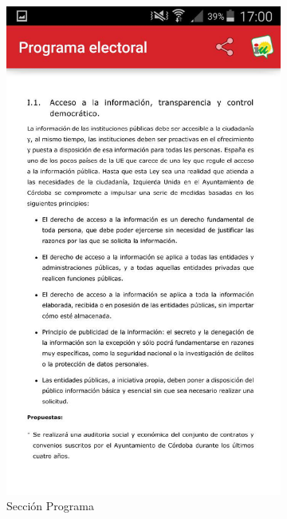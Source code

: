 \begin{figure}[H]
\begin{subfigure}[b]{0.3\textwidth}
                \includegraphics[width=\textwidth]{Media/Captures/IURecuperaCordobaSection.jpg}
                \caption{Sección Programa}
                \label{fig:iuSection}
        \end{subfigure}
        ~
        \begin{subfigure}[b]{0.3\textwidth}

\end{subfigure}
\end{figure}
